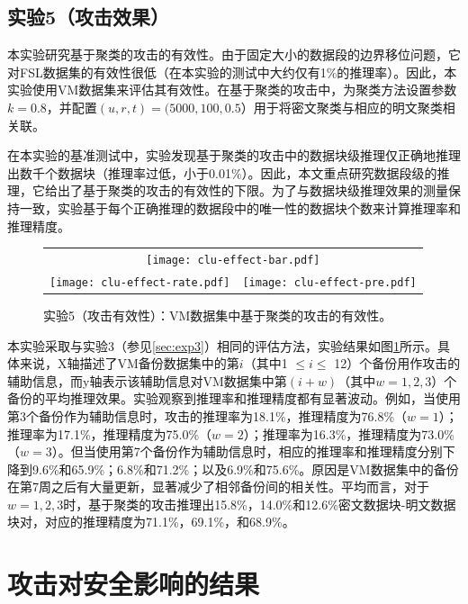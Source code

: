 \subsection{实验5（攻击效果）} 
\label{sec:exp5}
本实验研究基于聚类的攻击的有效性。由于固定大小的数据段的边界移位问题，它对FSL数据集的有效性很低（在本实验的测试中大约仅有1\%的推理率）。因此，本实验使用VM数据集来评估其有效性。在基于聚类的攻击中，为聚类方法设置参数$ k  = 0.8$，并配置$(u, r, t) = (5000, 100, 0.5）$用于将密文聚类与相应的明文聚类相关联。

在本实验的基准测试中，实验发现基于聚类的攻击中的数据块级推理仅正确地推理出数千个数据块（推理率过低，小于0.01\%）。因此，本文重点研究数据段级的推理，它给出了基于聚类的攻击的有效性的下限。为了与数据块级推理效果的测量保持一致，实验基于每个正确推理的数据段中的唯一性的数据块个数来计算推理率和推理精度。 

\begin{figure}[!htbp]
    \centering
    \begin{tabular}{p{.48\linewidth}p{.48\linewidth}}
        \multicolumn{2}{c}{\texttt{[image: clu-effect-bar.pdf]}}  \\
        \texttt{[image: clu-effect-rate.pdf]} &
        \texttt{[image: clu-effect-pre.pdf]}\\
    \end{tabular}
    \caption{实验5（攻击有效性）：VM数据集中基于聚类的攻击的有效性。}
    \label{fig:cluster-effect}
\end{figure}

本实验采取与实验3（参见\ref{sec:exp3}）相同的评估方法，实验结果如图\ref{fig:cluster-effect}所示。具体来说，X轴描述了VM备份数据集中的第$i$（其中1 $ \leq i \leq $ 12）个备份用作攻击的辅助信息，而y轴表示该辅助信息对VM数据集中第$(i + w)$（其中$w = 1,2,3$）个备份的平均推理效果。实验观察到推理率和推理精度都有显著波动。例如，当使用第3个备份作为辅助信息时，攻击的推理率为18.1\%，推理精度为76.8\%（$w = 1$）；推理率为17.1\%，推理精度为75.0\%（$w = 2$）；推理率为16.3\%，推理精度为73.0\%（$w = 3$）。但当使用第7个备份作为辅助信息时，相应的推理率和推理精度分别下降到9.6\%和65.9\%；6.8\%和71.2\%；以及6.9\%和75.6\%。原因是VM数据集中的备份在第7周之后有大量更新，显著减少了相邻备份间的相关性。平均而言，对于$w = 1,2,3$时，基于聚类的攻击推理出15.8\%，14.0\%和12.6\%密文数据块-明文数据块对，对应的推理精度为71.1\%，69.1\%，和68.9\%。

\section{攻击对安全影响的结果}
\label{sec:case}

